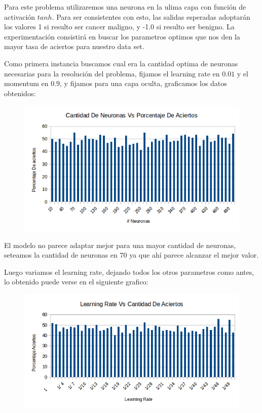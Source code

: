 Para este problema utilizaremos una neurona en la ulima capa con función de activación $tanh$. Para ser consistentes con esto, las salidas esperadas adoptarán los valores 1 si resulto ser cancer maligno, y -1.0 si resulto ser benigno. La experimentación consistirá en buscar los parametros optimos que nos den la mayor tasa de aciertos para nuestro data set.

Como primera instancia buscamos cual era la cantidad optima de neuronas necesarias para la resolución del problema, fijamos el learning rate en $0.01$ y el momentum en $0.9$, y fijamos para una capa oculta, graficamos los datos obtenidos:

\begin{figure}[!ht]
  \centering
    \includegraphics[scale=0.5]{neruonas_vs_aciertos.png}
\end{figure}

El modelo no parece adaptar mejor para una mayor cantidad de neuronas, seteamos la cantidad de neuronas en $70$ ya que ahí parece alcanzar el mejor valor.

Luego variamos el learning rate, dejando todos los otros parametros como antes, lo obtenido puede verse en el siguiente grafico:

\begin{figure}[!ht]
  \centering
    \includegraphics[scale=0.5]{learning_rate.png}
\end{figure}

